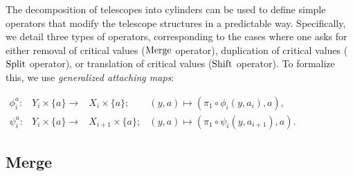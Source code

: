 The decomposition of telescopes into cylinders can be used to define simple operators that 
modify the telescope structures in a predictable way. Specifically, we detail three
types of operators, corresponding to the cases where one asks for either removal of critical
values ($\mathrm{Merge}$ operator), %
duplication of critical values ($\mathrm{Split}$ operator), %
or translation of critical values ($\mathrm{Shift}$ operator). %
To formalize this, we use \textit{generalized attaching maps}:

\begin{center}
$\begin{array}{llll}
\phi_i^a: & Y_i\times\{a\}\rightarrow & X_i\times\{a\}; & (y,a) \mapsto(\pi_1\circ\phi_i(y,a_i),a), \\
\psi_i^a: & Y_i\times\{a\}\rightarrow & X_{i+1}\times\{a\}; & (y,a) \mapsto(\pi_1\circ\psi_i(y,a_{i+1}),a).
\end{array}$
\end{center}


\subsection*{Merge}
\label{sec:merge}

